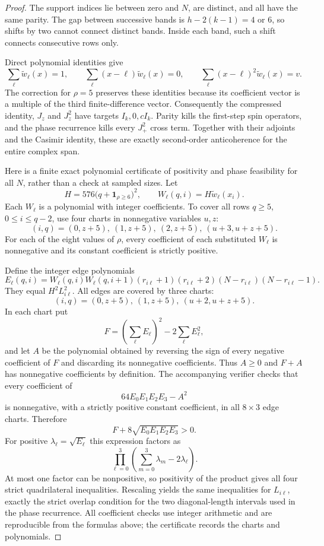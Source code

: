 \documentclass[11pt]{article}
\begin{document}
\begin{proof}
The support indices lie between zero and $N$, are distinct, and all have
the same parity. The gap between successive bands is
$h-2(k-1)=4$ or $6$, so shifts by two cannot connect distinct bands.
Inside each band, such a shift connects consecutive rows only.

Direct polynomial identities give
\[
 \sum_\ell\widetilde w_\ell(x)=1,\qquad
 \sum_\ell(x-\ell)\widetilde w_\ell(x)=0,\qquad
 \sum_\ell(x-\ell)^2\widetilde w_\ell(x)=v.
\]
The correction for $\rho=5$ preserves these identities because its
coefficient vector is a multiple of the third finite-difference vector.
Consequently the compressed identity, $J_z$ and $J_z^2$ have targets
$I_k,0,cI_k$. Parity kills the first-step spin operators, and the phase
recurrence kills every $J_+^2$ cross term. Together with their adjoints
and the Casimir identity, these are exactly second-order anticoherence
for the entire complex span.

Here is a finite exact polynomial certificate of positivity and phase
feasibility for all $N$, rather than a check at sampled sizes.
Let
\[
 H=576\bigl(q+\mathbf1_{\rho\ge6}\bigr)^2,\qquad
 W_\ell(q,i)=H\widetilde w_\ell(x_i).
\]
Each $W_\ell$ is a polynomial with integer coefficients. To cover all
rows $q\ge5$, $0\le i\le q-2$, use four charts in nonnegative variables
$u,z$:
\[
 (i,q)=(0,z+5),\ (1,z+5),\ (2,z+5),\ (u+3,u+z+5).
\]
For each of the eight values of $\rho$, every coefficient of each
substituted $W_\ell$ is nonnegative and its constant coefficient is
strictly positive.

Define the integer edge polynomials
\[
 E_\ell(q,i)=W_\ell(q,i)W_\ell(q,i+1)
 (r_{i\ell}+1)(r_{i\ell}+2)(N-r_{i\ell})(N-r_{i\ell}-1).
\]
They equal $H^2L_{i\ell}^2$. All edges are covered by three charts:
\[
 (i,q)=(0,z+5),\ (1,z+5),\ (u+2,u+z+5).
\]
In each chart put
\[
 F=\left(\sum_\ell E_\ell\right)^2-2\sum_\ell E_\ell^2,
\]
and let $A$ be the polynomial obtained by reversing the sign of every
negative coefficient of $F$ and discarding its nonnegative coefficients.
Thus $A\ge0$ and $F+A$ has nonnegative coefficients by definition.
The accompanying verifier checks that every coefficient of
\[
 64E_0E_1E_2E_3-A^2
\]
is nonnegative, with a strictly positive constant coefficient, in all
$8\times3$ edge charts. Therefore
\[
 F+8\sqrt{E_0E_1E_2E_3}>0.
\]
For positive $\lambda_\ell=\sqrt{E_\ell}$ this expression factors as
\[
 \prod_{\ell=0}^3\left(\sum_{m=0}^3\lambda_m-2\lambda_\ell\right).
\]
At most one factor can be nonpositive, so positivity of the product gives
all four strict quadrilateral inequalities. Rescaling yields the same
inequalities for $L_{i\ell}$, exactly the strict overlap condition for
the two diagonal-length intervals used in the phase recurrence.
All coefficient checks use integer arithmetic and are reproducible from
the formulas above; the certificate records the charts and polynomials.
\end{proof}
\end{document}

